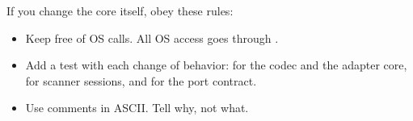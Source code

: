 If you change the core itself, obey these rules:

\begin{itemize}
  \item Keep  free of OS calls. All OS access goes through
        .
  \item Add a test with each change of behavior: 
        for the codec and the adapter core,  for
        scanner sessions, and  for the port contract.
  \item Use \code{/* */} comments in ASCII. Tell why, not what.
\end{itemize}
